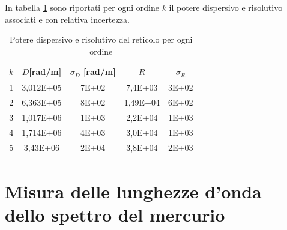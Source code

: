 \documentclass{article}
\begin{document}
        In tabella \ref{tabular:potere dispersivo e risolutivo} sono riportati per ogni ordine $k$ il potere dispersivo e risolutivo associati e con relativa incertezza. 
        \begin{table}[H]

            \centering

            \begin{tabular}{c c c c c }

                \toprule 
                $k$ & $D $[rad/m]  & $\sigma_D$ [rad/m] & $R$ & $\sigma_R$  \\
                \midrule
                1	&	3,012E+05	&	7E+02	&	7,4E+03	    &	3E+02   \\
                2	&	6,363E+05	&	8E+02	&	1,49E+04	&	6E+02   \\
                3	&	1,017E+06	&	1E+03	&	2,2E+04	    &	1E+03   \\
                4	&	1,714E+06	&	4E+03	&	3,0E+04	    &	1E+03   \\
                5	&	3,43E+06	&	2E+04	&	3,8E+04 	&  	2E+03   \\
                \bottomrule
        
            \end{tabular}

            \caption{Potere dispersivo e risolutivo del reticolo per ogni ordine}
            \label{tabular:potere dispersivo e risolutivo}

        \end{table}
        

    \section{Misura delle lunghezze d'onda dello spettro del mercurio}
\end{document}
